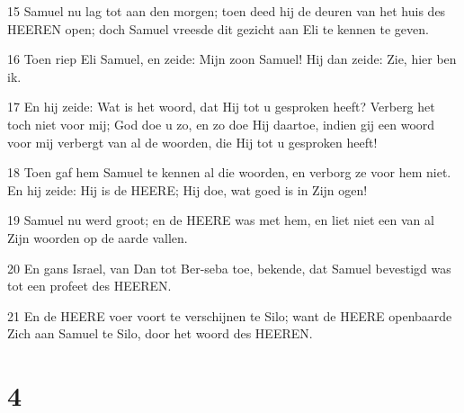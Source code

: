 \par 15 Samuel nu lag tot aan den morgen; toen deed hij de deuren van het huis des HEEREN open; doch Samuel vreesde dit gezicht aan Eli te kennen te geven.
\par 16 Toen riep Eli Samuel, en zeide: Mijn zoon Samuel! Hij dan zeide: Zie, hier ben ik.
\par 17 En hij zeide: Wat is het woord, dat Hij tot u gesproken heeft? Verberg het toch niet voor mij; God doe u zo, en zo doe Hij daartoe, indien gij een woord voor mij verbergt van al de woorden, die Hij tot u gesproken heeft!
\par 18 Toen gaf hem Samuel te kennen al die woorden, en verborg ze voor hem niet. En hij zeide: Hij is de HEERE; Hij doe, wat goed is in Zijn ogen!
\par 19 Samuel nu werd groot; en de HEERE was met hem, en liet niet een van al Zijn woorden op de aarde vallen.
\par 20 En gans Israel, van Dan tot Ber-seba toe, bekende, dat Samuel bevestigd was tot een profeet des HEEREN.
\par 21 En de HEERE voer voort te verschijnen te Silo; want de HEERE openbaarde Zich aan Samuel te Silo, door het woord des HEEREN.

\chapter{4}


